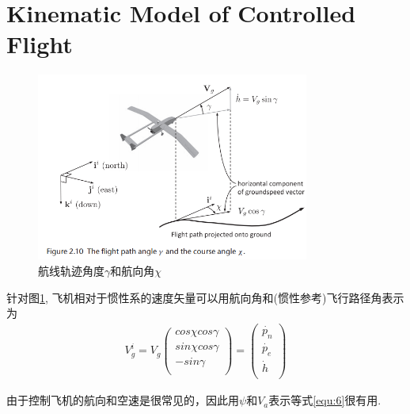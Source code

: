     \section{Kinematic Model of Controlled Flight}
    \begin{figure}[htpb]
        \centering
        \includegraphics[width=0.8\textwidth]{pictures/chapter3/2_10.png}
        \caption{航线轨迹角度$\gamma$和航向角$\chi$}
        \label{fig:2_10}
    \end{figure}
    针对图\ref{fig:2_10}, 飞机相对于惯性系的速度矢量可以用航向角和(惯性参考)飞行路径角表示为 
    \begin{gather} %
        V_{g}^{i} = V_{g} \begin{pmatrix}
            cos \chi cos \gamma \\
            sin \chi cos \gamma \\
            -sin \gamma \\
          \end{pmatrix}
          = \begin{pmatrix}
            \dot{p_{n}} \\
            \dot{p_{e}} \\
            \dot{h} \\
          \end{pmatrix}
          \label{equ:6}
      \end{gather}
    \par 由于控制飞机的航向和空速是很常见的，因此用$\psi$和$V_{a}$表示等式\ref{equ:6}很有用. 
